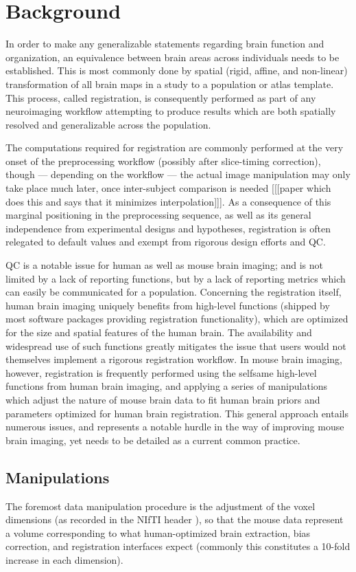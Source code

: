 \section{Background}

In order to make any generalizable statements regarding brain function and organization, an equivalence between brain areas across individuals needs to be established.
This is most commonly done by spatial (rigid, affine, and non-linear) transformation of all brain maps in a study to a population or atlas template.
This process, called registration, is consequently performed as part of any neuroimaging workflow attempting to produce results which are both spatially resolved and generalizable across the population.

The computations required for registration are commonly performed at the very onset of the preprocessing workflow (possibly after slice-timing correction),
though --- depending on the workflow --- the actual image manipulation may only take place much later, once inter-subject comparison is needed [[[paper which does this and says that it minimizes interpolation]]].
As a consequence of this marginal positioning in the preprocessing sequence, as well as its general independence from experimental designs and hypotheses, registration is often relegated to default values and exempt from rigorous design efforts and QC.

QC is a notable issue for human as well as mouse brain imaging;
and is not limited by a lack of reporting functions, but by a lack of reporting metrics which can easily be communicated for a population.
Concerning the registration itself, human brain imaging uniquely benefits from high-level functions (shipped by most software packages providing registration functionality), which are optimized for the size and spatial features of the human brain.
The availability and widespread use of such functions greatly mitigates the issue that users would not themselves implement a rigorous registration workflow.
In mouse brain imaging, however, registration is frequently performed using the selfsame high-level functions from human brain imaging, and applying a series of manipulations which adjust the nature of mouse brain data to fit human brain priors and parameters optimized for human brain registration.
This general approach entails numerous issues, and represents a notable hurdle in the way of improving mouse brain imaging, yet needs to be detailed as a current common practice.

\subsection{Manipulations}
The foremost data manipulation procedure is the adjustment of the voxel dimensions (as recorded in the NIfTI header \cite{nifti}), so that the mouse data represent a volume corresponding to what human-optimized brain extraction, bias correction, and registration interfaces expect (commonly this constitutes a 10-fold increase in each dimension).

